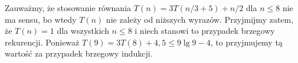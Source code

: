 Zauważmy, że stosowanie równania $T(n)=3T(n/3+5)+n/2$ dla $n\le8$ nie ma sensu, bo wtedy $T(n)$ nie zależy od niższych wyrazów. Przyjmijmy zatem, że $T(n)=1$ dla wszystkich $n\le8$ i niech stanowi to przypadek brzegowy rekurencji. Ponieważ $T(9)=3T(8)+4{,}5\le9\lg9-4$, to przyjmujemy tą wartość za przypadek brzegowy indukcji.

% 
% 

